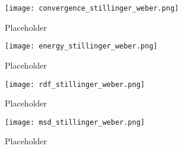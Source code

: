 \begin{figure}[h]
    \centering
    \texttt{[image: convergence\_stillinger\_weber.png]}
    \caption{Placeholder}
    \label{fig:msd}
\end{figure}

\begin{figure}[h]
    \centering
    \texttt{[image: energy\_stillinger\_weber.png]}
    \caption{Placeholder}
    \label{fig:msd}
\end{figure}

\begin{figure}[h]
    \centering
    \texttt{[image: rdf\_stillinger\_weber.png]}
    \caption{Placeholder}
    \label{fig:msd}
\end{figure}

\begin{figure}[h]
    \centering
    \texttt{[image: msd\_stillinger\_weber.png]}
    \caption{Placeholder}
    \label{fig:msd}
\end{figure}

